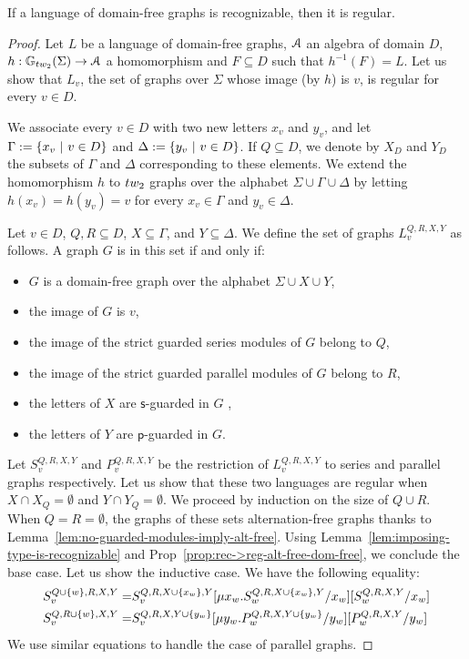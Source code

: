\begin{proposition}\label{prop:rec->reg-dom-free}
If a language of domain-free graphs is recognizable, then it is regular.
\end{proposition}
\begin{proof}
Let $L$ be a language of domain-free graphs, $\mathcal A$ an algebra of domain $D$, $h:\mathbb{G}_\TWT(\Sigma) \to \A$ a homomorphism and $F\subseteq D$ such that $h^{-1}(F)=L$. Let us show that $L_v$, the set of graphs over $\Sigma$ whose image (by $h$) is $v$,  is regular for every $v\in D$. 
\medskip

We associate every $v\in D$ with two new letters $x_v$ and $y_v$, and let  $\Gamma:=\left\{x_v\ | \ v\in D\right\}$ and $\Delta:=\left\{y_v\ | \ v\in D\right\}$. If $Q\subseteq D$, we denote by $X_D$ and $Y_D$ the subsets of $\Gamma$ and $\Delta$ corresponding to these elements.   We extend the homomorphism $h$ to $\TWT$ graphs over the alphabet $\Sigma \cup \Gamma \cup \Delta$ by letting $h(x_v)=h(y_v)=v$ for every $x_v\in\Gamma$ and $y_v\in\Delta$.
\medskip

Let $v\in D$, $Q, R\subseteq D$, $X\subseteq \Gamma$, and $Y\subseteq \Delta$.  We define the set of graphs $L^{Q,R,X,Y}_{v}$ as follows. A graph  $G$ is in this set if and only if:

\begin{itemize}
\item $G$ is a domain-free graph over the alphabet $\Sigma\cup X\cup Y$, 
\item the image of $G$ is $v$,
\item  the image of the strict guarded series modules of $G$ belong to $Q$, 
\item   the image of the strict guarded parallel modules of $G$ belong to $R$, 
\item the letters of $X$ are $\mathsf{s}$-guarded  in $G$ ,
\item the letters of $Y$ are $\mathsf{p}$-guarded in $G$.  
\end{itemize}
\smallskip

 Let $S^{Q,R,X,Y}_{v}$ and $P^{Q,R,X,Y}_{v}$ be the restriction of $L^{Q,R,X,Y}_{v}$ to series and parallel graphs respectively. Let us show that these two languages are regular  when $X\cap X_Q=\emptyset$ and $Y\cap Y_Q=\emptyset$. We proceed by induction on the size of $Q\cup R$. When $Q=R=\emptyset$, the graphs of these sets  alternation-free graphs thanks to  Lemma~\ref{lem:no-guarded-modules-imply-alt-free}. Using Lemma~\ref{lem:imposing-type-is-recognizable} and Prop~\ref{prop:rec->reg-alt-free-dom-free}, we conclude the base case. Let us show the inductive case. We have the following equality:
\begin{align*}
S^{Q\cup\left\{w\right\},R,X,Y}_v=&S^{Q,R,X\cup\left\{x_w\right\},Y}_v[\mu x_w. S^{Q,R,X\cup\left\{x_w\right\},Y}_w/x_w][S^{Q,R,X,Y}_w/x_w]\\
S^{Q,R\cup\left\{w\right\},X,Y}_v=&S^{Q,R,X,Y\cup\left\{y_w\right\}}_v[\mu y_w. P^{Q,R,X,Y\cup\left\{y_w\right\}}_w/y_w][P^{Q,R,X,Y}_w/y_w]
\end{align*}
We use similar equations to handle the case of parallel graphs.
\medskip


\end{proof}
